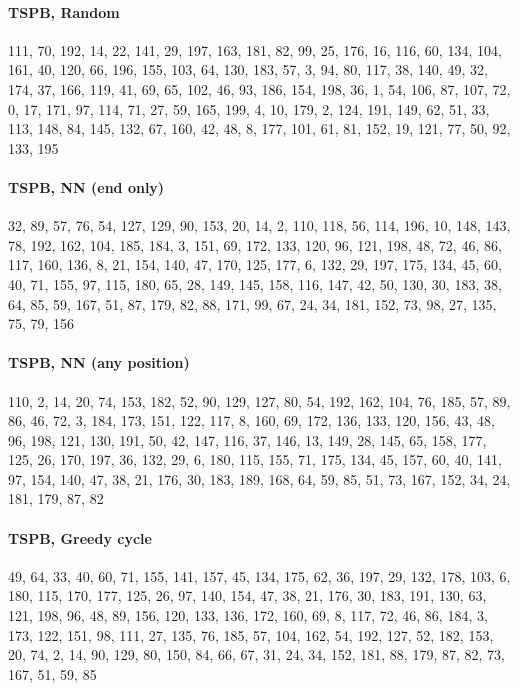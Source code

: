 \paragraph{TSPB, Random}
{\footnotesize\ttfamily\raggedright 111, 70, 192, 14, 22, 141, 29, 197, 163, 181, 82, 99, 25, 176, 16, 116, 60, 134, 104, 161, 40, 120, 66, 196, 155, 103, 64, 130, 183, 57, 3, 94, 80, 117, 38, 140, 49, 32, 174, 37, 166, 119, 41, 69, 65, 102, 46, 93, 186, 154, 198, 36, 1, 54, 106, 87, 107, 72, 0, 17, 171, 97, 114, 71, 27, 59, 165, 199, 4, 10, 179, 2, 124, 191, 149, 62, 51, 33, 113, 148, 84, 145, 132, 67, 160, 42, 48, 8, 177, 101, 61, 81, 152, 19, 121, 77, 50, 92, 133, 195\par}

\paragraph{TSPB, NN (end only)}
{\footnotesize\ttfamily\raggedright 32, 89, 57, 76, 54, 127, 129, 90, 153, 20, 14, 2, 110, 118, 56, 114, 196, 10, 148, 143, 78, 192, 162, 104, 185, 184, 3, 151, 69, 172, 133, 120, 96, 121, 198, 48, 72, 46, 86, 117, 160, 136, 8, 21, 154, 140, 47, 170, 125, 177, 6, 132, 29, 197, 175, 134, 45, 60, 40, 71, 155, 97, 115, 180, 65, 28, 149, 145, 158, 116, 147, 42, 50, 130, 30, 183, 38, 64, 85, 59, 167, 51, 87, 179, 82, 88, 171, 99, 67, 24, 34, 181, 152, 73, 98, 27, 135, 75, 79, 156\par}

\paragraph{TSPB, NN (any position)}
{\footnotesize\ttfamily\raggedright 110, 2, 14, 20, 74, 153, 182, 52, 90, 129, 127, 80, 54, 192, 162, 104, 76, 185, 57, 89, 86, 46, 72, 3, 184, 173, 151, 122, 117, 8, 160, 69, 172, 136, 133, 120, 156, 43, 48, 96, 198, 121, 130, 191, 50, 42, 147, 116, 37, 146, 13, 149, 28, 145, 65, 158, 177, 125, 26, 170, 197, 36, 132, 29, 6, 180, 115, 155, 71, 175, 134, 45, 157, 60, 40, 141, 97, 154, 140, 47, 38, 21, 176, 30, 183, 189, 168, 64, 59, 85, 51, 73, 167, 152, 34, 24, 181, 179, 87, 82\par}

\paragraph{TSPB, Greedy cycle}
{\footnotesize\ttfamily\raggedright 49, 64, 33, 40, 60, 71, 155, 141, 157, 45, 134, 175, 62, 36, 197, 29, 132, 178, 103, 6, 180, 115, 170, 177, 125, 26, 97, 140, 154, 47, 38, 21, 176, 30, 183, 191, 130, 63, 121, 198, 96, 48, 89, 156, 120, 133, 136, 172, 160, 69, 8, 117, 72, 46, 86, 184, 3, 173, 122, 151, 98, 111, 27, 135, 76, 185, 57, 104, 162, 54, 192, 127, 52, 182, 153, 20, 74, 2, 14, 90, 129, 80, 150, 84, 66, 67, 31, 24, 34, 152, 181, 88, 179, 87, 82, 73, 167, 51, 59, 85\par}
